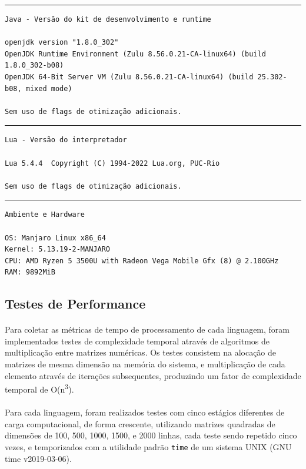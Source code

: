 \documentclass[11pt]{article}
\begin{document}
\hrule

\begin{verbatim}
Java - Versão do kit de desenvolvimento e runtime

openjdk version "1.8.0_302"
OpenJDK Runtime Environment (Zulu 8.56.0.21-CA-linux64) (build 1.8.0_302-b08)
OpenJDK 64-Bit Server VM (Zulu 8.56.0.21-CA-linux64) (build 25.302-b08, mixed mode)

Sem uso de flags de otimização adicionais.
\end{verbatim}

\hrule

\begin{verbatim}
Lua - Versão do interpretador

Lua 5.4.4  Copyright (C) 1994-2022 Lua.org, PUC-Rio

Sem uso de flags de otimização adicionais.
\end{verbatim}

\hrule

\begin{verbatim}
Ambiente e Hardware

OS: Manjaro Linux x86_64 
Kernel: 5.13.19-2-MANJARO 
CPU: AMD Ryzen 5 3500U with Radeon Vega Mobile Gfx (8) @ 2.100GHz 
RAM: 9892MiB 
\end{verbatim}

\newpage
\subsection{Testes de Performance}
\paragraph{}
Para coletar as métricas de tempo de processamento de cada linguagem, foram
implementados testes de complexidade temporal através de algoritmos de
multiplicação entre matrizes numéricas.
Os testes consistem na alocação de matrizes de mesma dimensão na memória do
sistema, e multiplicação de cada elemento através de iterações subsequentes,
produzindo um fator de complexidade temporal de
O(n\textsuperscript{3})\cite{stothers2010complexity}.

\paragraph{}
Para cada linguagem, foram realizados testes com cinco estágios diferentes de
carga computacional, de forma crescente, utilizando matrizes quadradas de
dimensões de 100, 500, 1000, 1500, e 2000 linhas, cada teste sendo repetido
cinco vezes, e temporizados com a utilidade padrão \texttt{time} de um sistema
UNIX (GNU time v2019-03-06).
\end{document}
